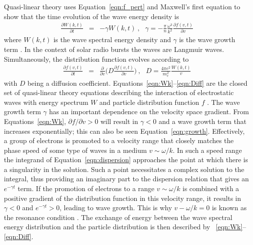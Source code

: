 Quasi-linear theory uses Equation~\ref{eqn:f_pert} and Maxwell's first equation to show that the time evolution of the wave energy density is
\begin{eqnarray}
\frac{\partial W(k,t)}{\partial t} &=& -\gamma W(k,t)~,~~~\gamma = -\frac{\pi}{n}\frac{\omega^3}{k^2} \frac{\partial f(v,t)}{\partial v}
\label{eqn:Wk}
\end{eqnarray}
where $W(k,t)$ is the wave spectral energy density and $\gamma$ is the wave growth term \citep{vedenov1963}. In the context of solar radio bursts the waves are Langmuir waves.
Simultaneously, the distribution function evolves according to 
\begin{eqnarray}
\frac{\partial f(v,t)}{\partial t} &=& \frac{\partial }{\partial v} \bigg(D\frac{\partial f(v,t)}{\partial v}\bigg)~,~~~D = \frac{4\pi e^2}{m_e^2}\frac{W(k,t)}{v}
\label{eqn:Diff}
\end{eqnarray}
with $D$ being a diffusion coefficient. Equations~\ref{eqn:Wk}--\ref{eqn:Diff} are the closed set of quasi-linear theory equations describing the interaction of electrostatic waves with energy spectrum $W$ and particle distribution function $f$ \citep{vedenov1963, kontar2001}. The wave growth term $\gamma$ has an important dependence on the velocity space gradient. From Equations~\ref{eqn:Wk}, $\partial f/\partial v >0$ will result in $\gamma <0$ and a wave growth term that increases exponentially; this can also be seen Equation~\ref{eqn:growth}. Effectively, a group of electrons is promoted to a velocity range that closely matches the phase speed of some type of waves in a medium $v \sim \omega/k$. In such a speed range the integrand of Equation~\ref{eqn:dispersion} approaches the point at which there is a singularity in the solution. Such a point necessitates a complex solution to the integral, thus providing an imaginary part to the dispersion relation that gives an $e^{-\gamma t}$ term. If the promotion of electrons to a range $v \sim \omega/k$ is combined with a positive gradient of the distribution function in this velocity range, it results in $\gamma < 0$ and $e^{-\gamma t}>0$, leading to wave growth. This is why $v - \omega/k=0$ is known as the resonance condition \citep{melrose1989}. The exchange of energy between the wave spectral energy distribution and the particle distribution is then described by ~\ref{eqn:Wk}--\ref{eqn:Diff}.

